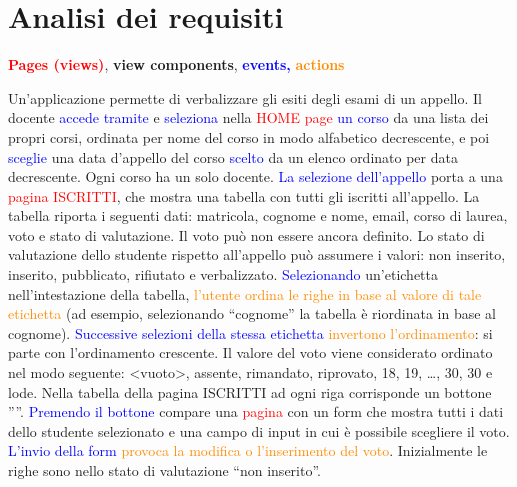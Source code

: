 \documentclass[a4paper,12pt]{scrreprt}
\newcommand{\ulblue}[1]{\bgroup\markoverwith{\textcolor{blue}{\rule[-0.5ex]{2pt}{0.4pt}}}\ULon{#1}\egroup}
\newcommand{\ulgreen}[1]{\bgroup\markoverwith{\textcolor{green!60!black}{\rule[-0.5ex]{2pt}{0.4pt}}}\ULon{#1}\egroup}
\begin{document}
\section{Analisi dei requisiti}
\begin{center}
  \textcolor{red}{\textbf{Pages (views)}},
  \textcolor{green!60!black}{\textbf{view components}},
  \textcolor{blue}{\textbf{events,}}
  \textcolor{darkorange}{\textbf{actions}}
\end{center}
Un’applicazione permette di verbalizzare gli esiti degli esami di un appello. Il docente \textcolor{blue}{accede tramite} \textcolor{red}{\ulblue{login}} e
\textcolor{blue}{seleziona} nella \textcolor{red}{HOME page} \textcolor{blue}{un corso} da \textcolor{green!60!black}{una lista dei propri corsi, ordinata per nome del corso in modo alfabetico
decrescente}, e poi \textcolor{blue}{sceglie} \textcolor{green!60!black}{una data d’appello del corso} \textcolor{blue}{scelto} \textcolor{green!60!black}{da un elenco ordinato per data decrescente}. Ogni
corso ha un solo docente. \textcolor{blue}{La selezione dell’appello} porta a una \textcolor{red}{pagina ISCRITTI}, che \textcolor{green!60!black}{mostra una tabella con tutti gli
iscritti all’appello}. La tabella riporta i seguenti dati: matricola, cognome e nome, email, corso di laurea, voto e stato
di valutazione. Il voto può non essere ancora definito. Lo stato di valutazione dello studente rispetto all’appello può
assumere i valori: non inserito, inserito, pubblicato, rifiutato e verbalizzato. \textcolor{blue}{Selezionando} \textcolor{green!60!black}{un’etichetta
nell’intestazione della tabella}, \textcolor{darkorange}{l’utente ordina le righe in base al valore di tale etichetta} (ad esempio, selezionando
“cognome” la tabella è riordinata in base al cognome). \textcolor{blue}{Successive selezioni della stessa etichetta} \textcolor{darkorange}{invertono
l’ordinamento}: si parte con l’ordinamento crescente. Il valore del voto viene considerato ordinato nel modo
seguente: <vuoto>, assente, rimandato, riprovato, 18, 19, …, 30, 30 e lode. Nella tabella della pagina ISCRITTI \textcolor{green!60!black}{ad
ogni riga corrisponde un bottone} ''\textcolor{red}{\ulgreen{MODIFICA}}''. \textcolor{blue}{Premendo il bottone} compare una \textcolor{red}{pagina} con \textcolor{green!60!black}{un form che mostra
tutti i dati dello studente selezionato} e \textcolor{green!60!black}{una campo di input in cui è possibile scegliere il voto}.\textcolor{blue}{ L’invio della form}
\textcolor{darkorange}{provoca la modifica o l’inserimento del voto}. Inizialmente le righe sono nello stato di valutazione “non inserito”.
\end{document}
